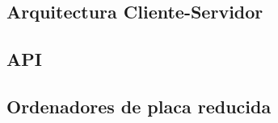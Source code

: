 \subsection{Arquitectura Cliente-Servidor}

\subsection{API}

\subsection{Ordenadores de placa reducida}



 




